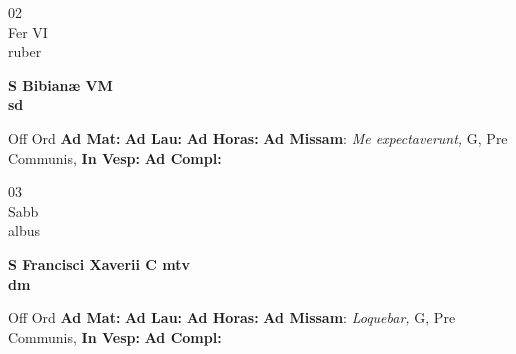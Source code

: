 \documentclass[10pt, openany]{book}
\begin{document}
        \begin{center}
            \begin{minipage}{3.5in}
                \vspace{2em}
                \begin{minipage}{0.5in}
                    {\Huge 02} \\
                    {\normalsize Fer VI} \\
                    {\normalsize ruber}
                \end{minipage}
                \begin{minipage}{3.0in}
                    \textbf{ \large S Bibianæ VM \\
                    \textnormal{\normalsize sd}} \\ 
                \end{minipage}
                \begin{justify}Off Ord
                    \textbf{Ad Mat: }
                    \textbf{Ad Lau: }
                    \textbf{Ad Horas: }\textbf{Ad Missam}: \textit{Me expectaverunt,} G, Pre Communis,  
                    \textbf{In Vesp: }
                    \textbf{Ad Compl: }
                \end{justify}
            \end{minipage}
        \end{center}
    
        \begin{center}
            \begin{minipage}{3.5in}
                \vspace{2em}
                \begin{minipage}{0.5in}
                    {\Huge 03} \\
                    {\normalsize Sabb} \\
                    {\normalsize albus}
                \end{minipage}
                \begin{minipage}{3.0in}
                    \textbf{ \large S Francisci Xaverii C mtv \\
                    \textnormal{\normalsize dm}} \\ 
                \end{minipage}
                \begin{justify}Off Ord
                    \textbf{Ad Mat: }
                    \textbf{Ad Lau: }
                    \textbf{Ad Horas: }\textbf{Ad Missam}: \textit{Loquebar,} G, Pre Communis,  
                    \textbf{In Vesp: }
                    \textbf{Ad Compl: }
                \end{justify}
            \end{minipage}
        \end{center}
    
\end{document}
